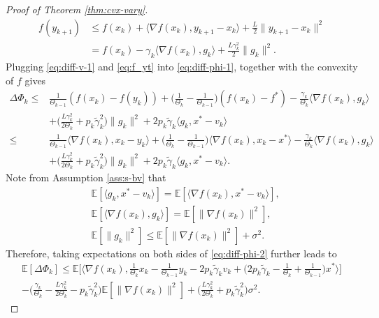 \documentclass[10pt]{article}
\numberwithin{equation}{section}
\theoremstyle{definition}
\newcommand{\ebb}{\mathbb{E}}  %
\begin{document}
\begin{proof}[Proof of Theorem \ref{thm:cvx-vary}]
\begin{equation}
\begin{aligned}
f(y_{k+1}) & \leq f(x_k)+\langle\nabla f(x_k), y_{k+1}-x_k\rangle+\frac{L}{2}\|y_{k+1}-x_k\|^2 \\
& =f(x_k)-\gamma_k\langle\nabla f(x_k), g_k\rangle+\frac{L \gamma_k^2}{2}\|g_k\|^2.
\end{aligned}
\end{equation}
Plugging \eqref{eq:diff-v-1} and \eqref{eq:f_yt} into \eqref{eq:diff-phi-1}, together with the convexity of $f$ gives
\begin{equation}\label{eq:diff-phi-2}
\begin{aligned}
\Delta \Phi_k \leq & \frac{1}{\Theta_{k-1}}(f(x_k)-f(y_k))+\Big(\frac{1}{\Theta_k}-\frac{1}{\Theta_{k-1}}\Big)(f(x_k)-f^*)-\frac{\gamma_k}{\Theta_k}\langle\nabla f(x_k), g_k\rangle\\
&+\Big(\frac{L \gamma_k^2}{2 \Theta_k}+p_k \tilde{\gamma}_k^2\Big)\|g_k\|^2 +2 p_k \tilde{\gamma}_k\langle g_k, x^*-v_k\rangle \\
\leq & \frac{1}{\Theta_{k-1}}\langle\nabla f(x_k), x_k-y_k\rangle+\Big(\frac{1}{\Theta_k}-\frac{1}{\Theta_{k-1}}\Big)\langle\nabla f(x_k), x_k-x^*\rangle -\frac{\gamma_k}{\Theta_k}\langle\nabla f(x_k), g_k\rangle\\
& +\Big(\frac{L \gamma_k^2}{2 \Theta_k}+p_k \tilde{\gamma}_k^2\Big)\|g_k\|^2+2 p_k \tilde{\gamma}_k\langle g_k, x^*-v_k\rangle.
\end{aligned}
\end{equation}
Note from Assumption \ref{ass:s-bv} that
\begin{align*}
    &\ebb[\langle g_k, x^*-v_k\rangle]=\ebb[\langle \nabla f(x_k), x^*-v_k\rangle],\\
    &\ebb[\langle\nabla f(x_k), g_k\rangle] = \ebb[\|\nabla f(x_k)\|^2],\\
    &\ebb[\|g_k\|^2]\leq \ebb[\|\nabla f(x_k)\|^2] + \sigma^2.
\end{align*}
Therefore, taking expectations on both sides of \eqref{eq:diff-phi-2} further leads to
\begin{multline}\label{eq:diff-phi-3}
\ebb[\Delta\Phi_k] \leq \ebb\Big[\Big\langle\nabla f(x_k), \frac{1}{\Theta_k} x_k-\frac{1}{\Theta_{k-1}} y_k-2 p_k \tilde{\gamma}_k v_k+\Big(2 p_k \tilde{\gamma}_k-\frac{1}{\Theta_k}+\frac{1}{\Theta_{k-1}}\Big) x^*\Big\rangle\Big] \\
-\Big(\frac{\gamma_k}{\Theta_k}-\frac{L \gamma_k^2}{2 \Theta_k}-p_k \tilde{\gamma}_k^2\Big) \ebb[\|\nabla f(x_k)\|^2]+\Big(\frac{L \gamma_k^2}{2 \Theta_k}+p_k \tilde{\gamma}_k^2\Big) \sigma^2.
\end{multline}


\end{proof}
\end{document}
